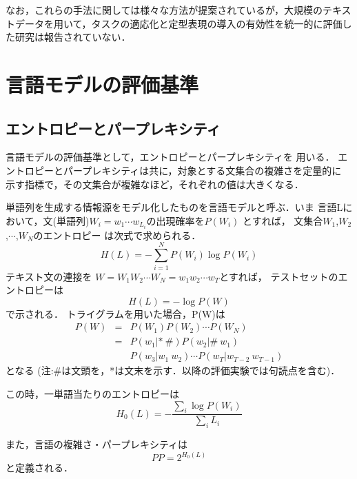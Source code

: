 なお，これらの手法に関しては様々な方法が提案されているが，大規模のテキス
トデータを用いて，タスクの適応化と定型表現の導入の有効性を統一的に評価し
た研究は報告されていない．

\vspace*{-3mm}
\section{言語モデルの評価基準}
\vspace*{-1mm}
\subsection{エントロピーとパープレキシティ}
言語モデルの評価基準として，エントロピーとパープレキシティを
用いる．
エントロピーとパープレキシティは共に，対象とする文集合の複雑さを定量的に 
示す指標で，その文集合が複雑なほど，それぞれの値は大きくなる．

単語列を生成する情報源をモデル化したものを言語モデルと呼ぶ．いま
\mbox{言語Lにおいて，文}(単語列)$W_i = {w_1}\cdots w_{L_i}$の出現確率を$P(W_i)$
とすれば，
文集合$W_1$,$W_2$,$\cdots$,$W_N$のエントロピー\break
は次式で求められる．
\vspace*{-3mm}
\begin{equation}
 H(L) = - \sum^{N}_{i=1} P(W_i) \log P(W_i)
\end{equation}
テキスト文の連接を $W = W_1 W_2 \cdots W_N = w_1 w_2 \cdots w_T$とすれば，
テストセットのエントロピーは
\vspace*{-3mm}
\begin{equation}
  H(L) = - \log P(W)
\end{equation}
で示される．
トライグラムを用いた場合，P(W)は
\vspace*{-3mm}
\begin{eqnarray} 
 P(W) & = & P(W_1) P(W_2) \cdots P(W_N) \nonumber \\
      & = & P(w_1|*\ \#) P(w_2 |\#\ w_1) \nonumber \\
      &   & P(w_3|w_1\ w_2)\cdots P(w_T|w_{T-2}\ w_{T-1})
\end{eqnarray}
となる
(注:\#は文頭を，*は文末を示す．以降の評価実験では句読点を含む)．

この時，一単語当たりのエントロピーは
\begin{equation}
 H_0(L) = - \frac{\sum_i \log P(W_i)}{\sum_i L_i}
\end{equation}

また，言語の複雑さ・パープレキシティは
\begin{equation}
 PP = 2^{H_0(L)}
\end{equation}
と定義される．

